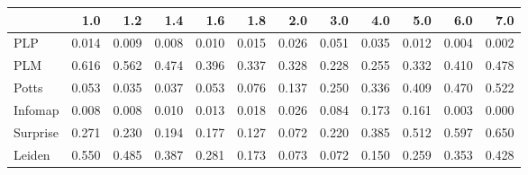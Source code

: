 \begin{tabular}{lrrrrrrrrrrr}
\toprule
{} &   1.0 &   1.2 &   1.4 &   1.6 &   1.8 &   2.0 &   3.0 &   4.0 &   5.0 &   6.0 &   7.0 \\
\midrule
PLP      & 0.014 & 0.009 & 0.008 & 0.010 & 0.015 & 0.026 & 0.051 & 0.035 & 0.012 & 0.004 & 0.002 \\
PLM      & 0.616 & 0.562 & 0.474 & 0.396 & 0.337 & 0.328 & 0.228 & 0.255 & 0.332 & 0.410 & 0.478 \\
Potts    & 0.053 & 0.035 & 0.037 & 0.053 & 0.076 & 0.137 & 0.250 & 0.336 & 0.409 & 0.470 & 0.522 \\
Infomap  & 0.008 & 0.008 & 0.010 & 0.013 & 0.018 & 0.026 & 0.084 & 0.173 & 0.161 & 0.003 & 0.000 \\
Surprise & 0.271 & 0.230 & 0.194 & 0.177 & 0.127 & 0.072 & 0.220 & 0.385 & 0.512 & 0.597 & 0.650 \\
Leiden   & 0.550 & 0.485 & 0.387 & 0.281 & 0.173 & 0.073 & 0.072 & 0.150 & 0.259 & 0.353 & 0.428 \\
\bottomrule
\end{tabular}
